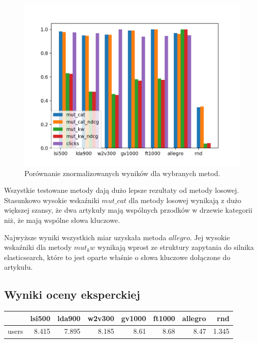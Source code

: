 \documentclass[pl]{minipw} %
\begin{document}
\begin{figure}[H]
	\centering
	\includegraphics[width=1\textwidth]{img/results/lsi500_lda900_w2v300_gv1000_ft1000_allegro_rnd_.png}
	\caption{Porównanie znormalizowanych wyników dla wybranych metod.}
\end{figure}

Wszystkie testowane metody dają dużo lepsze rezultaty od metody losowej. Stasunkowo wysokie wskaźniki $mut\_cat$ dla metody losowej wynikają z dużo większej szansy, że dwa artykuły mają wspólnych przodków w drzewie kategorii niż, że mają wspólne słowa kluczowe.

Najwyższe wyniki wszystkich miar uzyskała metoda $allegro$. Jej wysokie wskaźniki dla metody $mut_kw$ wynikają wprost ze struktury zapytania do silnika elasticsearch, które to jest oparte właśnie o słowa kluczowe dołączone do artykułu.

\subsection{Wyniki oceny eksperckiej}

\begin{center}
	\begin{tabular}{lrrrrrrr}
		\hline
		&   lsi500 &   lda900 &   w2v300 &   gv1000 &   ft1000 &   allegro &   rnd \\
		\hline
		users &    8.415 &    7.895 &    8.185 &     8.61 &     8.68 &      8.47 & 1.345 \\
		\hline
	\end{tabular}
\end{center}
\end{document}
